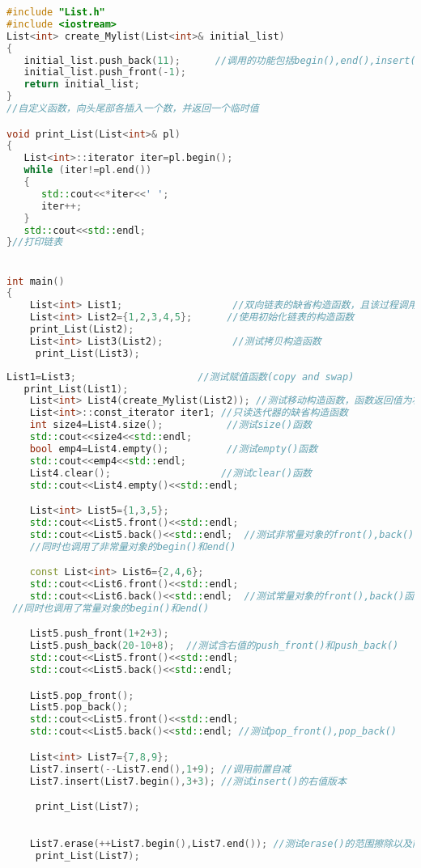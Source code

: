 \documentclass[UTF8]{ctexart}
\begin{document}
\begin{lstlisting}[language=C++, caption={List.cpp},keywordstyle=\color{cyan},commentstyle=\color{green},stringstyle=\color{red},breaklines=true]
#include "List.h"
#include <iostream>
List<int> create_Mylist(List<int>& initial_list)
{
   initial_list.push_back(11);      //调用的功能包括begin(),end(),insert()等函数
   initial_list.push_front(-1);
   return initial_list;
}
//自定义函数，向头尾部各插入一个数，并返回一个临时值

void print_List(List<int>& pl)
{
   List<int>::iterator iter=pl.begin();
   while (iter!=pl.end())
   {
      std::cout<<*iter<<' ';
      iter++;
   }
   std::cout<<std::endl;
}//打印链表


int main()
{
    List<int> List1;                   //双向链表的缺省构造函数，且该过程调用私有成员的init()
    List<int> List2={1,2,3,4,5};      //使用初始化链表的构造函数
    print_List(List2);
    List<int> List3(List2);            //测试拷贝构造函数
     print_List(List3);
\end{lstlisting}
\begin{lstlisting}[language=C++, keywordstyle=\color{cyan},commentstyle=\color{green},stringstyle=\color{red},breaklines=true]
    List1=List3;                     //测试赋值函数(copy and swap)
   print_List(List1);
    List<int> List4(create_Mylist(List2)); //测试移动构造函数，函数返回值为右值
    List<int>::const_iterator iter1; //只读迭代器的缺省构造函数
    int size4=List4.size();           //测试size()函数
    std::cout<<size4<<std::endl;
    bool emp4=List4.empty();          //测试empty()函数
    std::cout<<emp4<<std::endl;
    List4.clear();                   //测试clear()函数
    std::cout<<List4.empty()<<std::endl;

    List<int> List5={1,3,5};
    std::cout<<List5.front()<<std::endl;
    std::cout<<List5.back()<<std::endl;  //测试非常量对象的front(),back()函数
    //同时也调用了非常量对象的begin()和end()

    const List<int> List6={2,4,6};
    std::cout<<List6.front()<<std::endl;
    std::cout<<List6.back()<<std::endl;  //测试常量对象的front(),back()函数
 //同时也调用了常量对象的begin()和end()

    List5.push_front(1+2+3);
    List5.push_back(20-10+8);  //测试含右值的push_front()和push_back()
    std::cout<<List5.front()<<std::endl;
    std::cout<<List5.back()<<std::endl;

    List5.pop_front();
    List5.pop_back();
    std::cout<<List5.front()<<std::endl;
    std::cout<<List5.back()<<std::endl; //测试pop_front(),pop_back()

    List<int> List7={7,8,9};
    List7.insert(--List7.end(),1+9); //调用前置自减
    List7.insert(List7.begin(),3+3); //测试insert()的右值版本 

     print_List(List7);
 

    List7.erase(++List7.begin(),List7.end()); //测试erase()的范围擦除以及前置自增
     print_List(List7);
\end{lstlisting}
\end{document}
